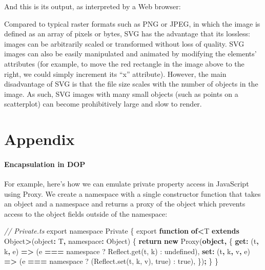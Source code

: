 \documentclass[
]{book}
\newenvironment{Shaded}{\begin{snugshade}}{\end{snugshade}}
\newcommand{\BuiltInTok}[1]{#1}
\newcommand{\CommentTok}[1]{\textcolor[rgb]{0.56,0.35,0.01}{\textit{#1}}}
\newcommand{\ControlFlowTok}[1]{\textcolor[rgb]{0.13,0.29,0.53}{\textbf{#1}}}
\newcommand{\DataTypeTok}[1]{\textcolor[rgb]{0.13,0.29,0.53}{#1}}
\newcommand{\ImportTok}[1]{#1}
\newcommand{\KeywordTok}[1]{\textcolor[rgb]{0.13,0.29,0.53}{\textbf{#1}}}
\newcommand{\NormalTok}[1]{#1}
\newcommand{\OperatorTok}[1]{\textcolor[rgb]{0.81,0.36,0.00}{\textbf{#1}}}
\theoremstyle{definition}
\theoremstyle{definition}
\theoremstyle{definition}
\theoremstyle{definition}
\theoremstyle{remark}
\begin{document}
And this is its output, as interpreted by a Web browser:

Compared to typical raster formats such as PNG or JPEG, in which the image is defined as an array of pixels or bytes, SVG has the advantage that its lossless: images can be arbitrarily scaled or transformed without loss of quality. SVG images can also be easily manipulated and animated by modifying the elements' attributes (for example, to move the red rectangle in the image above to the right, we could simply increment its ``x'' attribute). However, the main disadvantage of SVG is that the file size scales with the number of objects in the image. As such, SVG images with many small objects (such as points on a scatterplot) can become prohibitively large and slow to render.

\chapter{Appendix}\label{appendix}

\subsubsection{Encapsulation in DOP}\label{dop-encapsulation}

For example, here's how we can emulate private property access in JavaScript using Proxy. We create a namespace with a single constructor function that takes an object and a namespace and returns a proxy of the object which prevents access to the object fields outside of the namespace:

\begin{Shaded}
\begin{Highlighting}[]
\CommentTok{// Private.ts}
\ImportTok{export} \ImportTok{namespace} \DataTypeTok{Private}\NormalTok{ \{}
  \ImportTok{export} \KeywordTok{function} \KeywordTok{of}\OperatorTok{\textless{}}\NormalTok{T }\KeywordTok{extends} \BuiltInTok{Object}\OperatorTok{\textgreater{}}\NormalTok{(object}\OperatorTok{:}\NormalTok{ T}\OperatorTok{,}\NormalTok{ namespace}\OperatorTok{:} \BuiltInTok{Object}\NormalTok{) \{}
    \ControlFlowTok{return} \KeywordTok{new} \BuiltInTok{Proxy}\NormalTok{(}\KeywordTok{object}\OperatorTok{,}\NormalTok{ \{}
      \KeywordTok{get}\OperatorTok{:}\NormalTok{ (t}\OperatorTok{,}\NormalTok{ k}\OperatorTok{,}\NormalTok{ e) }\KeywordTok{=\textgreater{}}\NormalTok{ (e }\OperatorTok{===} \ImportTok{namespace}\NormalTok{ ? }\DataTypeTok{Reflect}\NormalTok{.}\DataTypeTok{get}\NormalTok{(}\DataTypeTok{t}\NormalTok{, }\DataTypeTok{k}\NormalTok{) : }\DataTypeTok{undefined}\NormalTok{),}
      \KeywordTok{set}\OperatorTok{:}\NormalTok{ (t}\OperatorTok{,}\NormalTok{ k}\OperatorTok{,}\NormalTok{ v}\OperatorTok{,}\NormalTok{ e) }\KeywordTok{=\textgreater{}}\NormalTok{ (e }\OperatorTok{===} \ImportTok{namespace}\NormalTok{ ? (}\DataTypeTok{Reflect}\NormalTok{.}\DataTypeTok{set}\NormalTok{(}\DataTypeTok{t}\NormalTok{, }\DataTypeTok{k}\NormalTok{, }\DataTypeTok{v}\NormalTok{), }\DataTypeTok{true}\NormalTok{) : }\DataTypeTok{true}\NormalTok{),}
\NormalTok{    \})}\OperatorTok{;}
\NormalTok{  \}}
\NormalTok{\}}
\end{Highlighting}
\end{Shaded}
\end{document}
